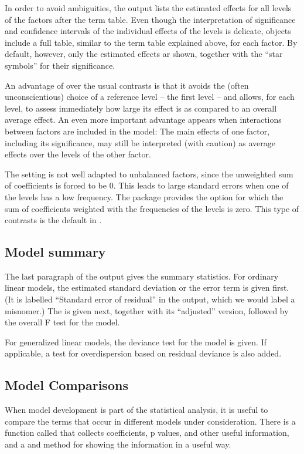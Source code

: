 \documentclass[11pt]{article}
\begin{document}
In order to avoid ambiguities, the  output lists the 
estimated effects for all levels of the factors after the term table.
Even though the interpretation of significance and confidence intervals of
the individual effects of the levels is delicate,  objects include
a full table, similar to the term table explained above, for each factor.
By default, however, only the estimated effects ar shown, together with the
``star symbols'' for their significance.

An advantage of  over the usual 
contrasts is that it avoids the (often unconscientious) choice of a
reference level -- the first level -- and allows, for each level, 
to assess immediately how large its effect is as compared to an overall
average effect.
An even more important advantage appears when interactions between factors
are included in the model: 
The main effects of one factor, including its significance, 
may still be interpreted (with caution) as average effects over the
levels of the other factor.

The  setting is not well adapted to unbalanced factors, since
the unweighted sum of coefficients is forced to be 0.
This leads to large standard errors when one of the levels has a low 
frequency. 
The  package provides the option  for which the
sum of coefficients weighted with the frequencies of the levels is zero.
This type of contrasts is the default in .

\subsection{Model summary}
The last paragraph of the output gives the summary statistics.
For ordinary linear models, the estimated standard deviation or the error
term is given first. (It is labelled ``Standard error of residual'' in the 
 output, which we would label a misnomer.)
The  is given next, together with its ``adjusted''
version, followed by the overall F test for the model.

For generalized linear models, the deviance test for the model is given.
If applicable, a test for overdispersion based on residual deviance is also
added. 

\subsection{Model Comparisons}
When model development is part of the statistical analysis, it is useful to
compare the terms that occur in different models under consideration.
There is a function called  that collects coefficients, 
p values, and other useful information, and a  and  
method for showing the information in a useful way.
\end{document}
